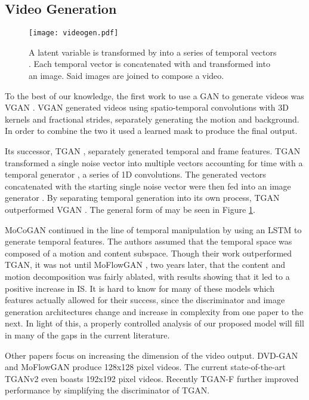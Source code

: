 \documentclass[tablecaption=bottom,pmlr]{jmlr}
\begin{document}
\subsection{Video Generation}

\begin{figure}
    \centering
    \texttt{[image: videogen.pdf]}
    \caption{A latent variable  is transformed by  into a series of temporal vectors . Each temporal vector  is concatenated with  and transformed into an image. Said images are joined to compose a video.}
    \label{fig:vid_gen}
\end{figure}

To the best of our knowledge, the first work to use a GAN to generate videos was VGAN \citep{vgan}. VGAN generated videos using  spatio-temporal convolutions with 3D kernels and fractional strides, separately generating the motion and background. In order to combine the two it used a learned mask to produce the final output. 

Its successor, TGAN \citep{tgan}, separately generated temporal and frame features. TGAN transformed a single noise vector into multiple vectors accounting for time with a temporal generator , a series of 1D convolutions. The generated vectors concatenated with the starting single noise vector were then fed into an image generator . By separating temporal generation into its own process, TGAN outperformed VGAN \citep{inceptionscore}. The general form of  may be seen in Figure \ref{fig:vid_gen}.

MoCoGAN \citep{mocogan} continued in the line of temporal manipulation by using an LSTM to generate temporal features. The authors assumed that the temporal space was composed of a motion and content subspace. Though their work outperformed TGAN, it was not until MoFlowGAN \citep{moflowgan}, two years later, that the content and motion decomposition was fairly ablated, with results showing that it led to a positive increase in IS. It is hard to know for many of these models which features actually allowed for their success, since the discriminator and image generation architectures change and increase in complexity from one paper to the next. In light of this, a properly controlled analysis of our proposed model will fill in many of the gaps in the current literature.

Other papers focus on increasing the dimension of the video output. DVD-GAN and MoFlowGAN \citep{dvdgan, moflowgan} produce 128x128 pixel videos. The current state-of-the-art TGANv2 \citep{tganv2} even boasts 192x192 pixel videos. Recently TGAN-F \citep{tganf} further improved performance by simplifying the discriminator of TGAN.
\end{document}

